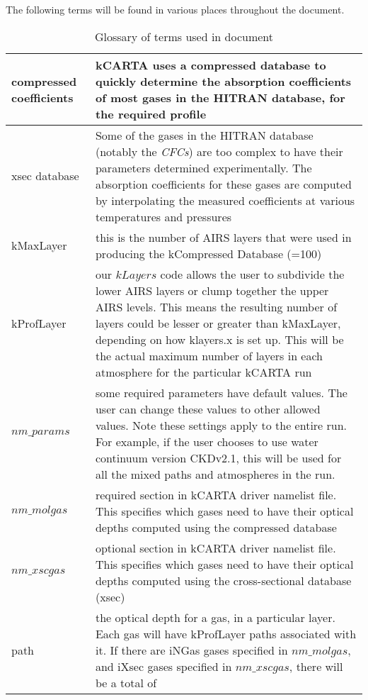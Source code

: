 \documentclass[12pt]{article}
\newcommand{\kc}{\textsf{kCARTA}\xspace}
\newlength{\colwidth}
\begin{document}
The following terms will be found in various places throughout the document.
\begin{longtable}{|l|p{\colwidth}|}
\caption{Glossary of terms used in document}\\
\hline
compressed   coefficients & \kc uses a compressed database to quickly 
determine the absorption coefficients of most gases in the {\sf HITRAN} 
database, for the required profile\\ \hline
xsec  database & Some of the gases in the {\sf HITRAN} database (notably the 
{\em CFCs}) are too complex to have their parameters determined 
experimentally. The absorption coefficients for these gases are computed by 
interpolating the measured coefficients at various temperatures and 
pressures\\ \hline
kMaxLayer & this is the number of AIRS layers that were used in producing the
            kCompressed Database (=100)\\ \hline
kProfLayer & our $kLayers$ code allows the user to subdivide the lower AIRS 
             layers or clump together the upper AIRS levels. This means the 
             resulting number of layers could be lesser or greater than 
             kMaxLayer, depending on how klayers.x is set up. This will be 
             the actual maximum number of layers in each atmosphere for the 
             particular \kc run   \\ \hline
$nm\_params$ & some required parameters have default values.  The user can 
              change these values to other allowed values. Note these settings
              apply to the entire run.  For example, if the user chooses to 
              use water continuum version CKDv2.1, this will be used for all 
              the mixed paths and atmospheres in the run.\\ \hline
$nm\_molgas$ & required section in \kc driver namelist file.  This specifies 
              which gases need to have their optical depths computed using the
              compressed database\\ \hline
$nm\_xscgas$ & optional section in \kc driver namelist file.  This specifies 
               which gases need to have their optical depths computed using
               the cross-sectional database (xsec)\\ \hline
path         & the optical depth for a gas, in a particular layer.
               Each gas will have kProfLayer paths associated with it. If 
               there are iNGas gases specified in $nm\_molgas$, and iXsec 
               gases specified in $nm\_xscgas$, there will be a total of 

\end{longtable}
\end{document}
